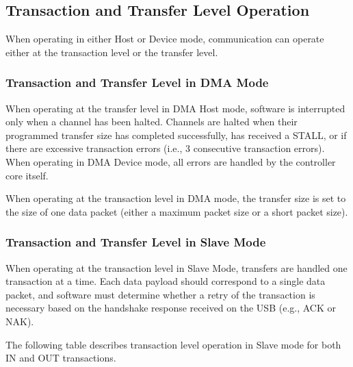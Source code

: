 \documentclass[main\_\_EN.tex]{subfiles}
\begin{document}
\subsection{Transaction and Transfer Level Operation}
When operating in either Host or Device mode, communication can operate either at the transaction level or the transfer level.

\subsubsection{Transaction and Transfer Level in DMA Mode}
When operating at the transfer level in DMA Host mode, software is interrupted only when a channel has been halted. Channels are halted when their programmed transfer size has completed successfully, has received a STALL, or if there are excessive transaction errors (i.e., 3 consecutive transaction errors). When operating in DMA Device mode, all errors are handled by the controller core itself.

When operating at the transaction level in DMA mode, the transfer size is set to the size of one data packet (either a maximum packet size or a short packet size).

\subsubsection{Transaction and Transfer Level in Slave Mode}
When operating at the transaction level in Slave Mode, transfers are handled one transaction at a time. Each data payload should correspond to a single data packet, and software must determine whether a retry of the transaction is necessary based on the handshake response received on the USB (e.g., ACK or NAK).

The following table describes transaction level operation in Slave mode for both IN and OUT transactions.
\end{document}
